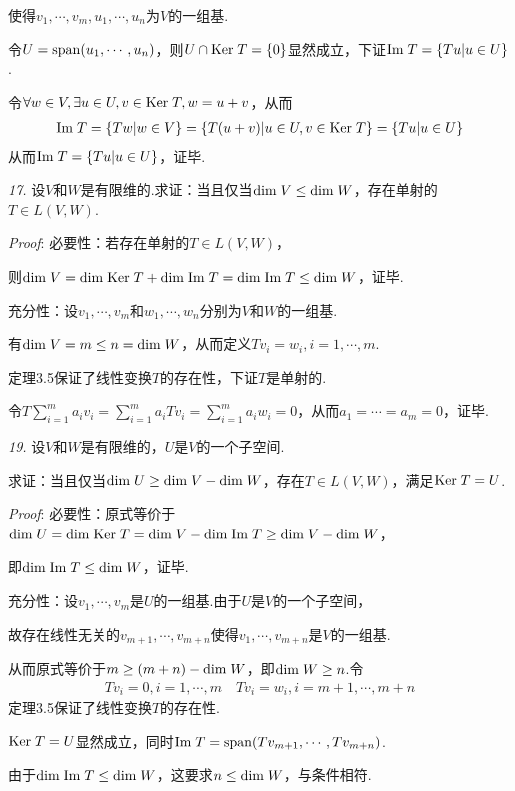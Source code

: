 使得$v_1,\cdots,v_m,u_1,\cdots,u_n$为$V$的一组基.

令$U=\mathrm{span} (u_1,\cdots,u_n)$，则$U\cap \mathrm{Ker \;} T=\{0\}$显然成立，下证$\mathrm{Im \;} T=\{Tu|u\in U\}$.

令$\forall w\in V,\exists u\in U,v\in \mathrm{Ker \;} T, w=u+v$，从而
    \begin{align*}
        \mathrm{Im \;} T=\{Tw|w\in V\}=\{T(u+v)|u\in U,v\in \mathrm{Ker \;} T\}=\{Tu|u\in U\}
    \end{align*}
从而$\mathrm{Im \;} T=\{Tu|u\in U\}$，证毕.

\newpage

\textit{17.}
设$V$和$W$是有限维的.求证：当且仅当$\mathrm{dim \;} V\leq \mathrm{dim \;} W$，存在单射的$T\in L(V,W)$.

\textit{Proof}:
必要性：若存在单射的$T\in L(V,W)$，

则$\mathrm{dim \;} V=\mathrm{dim \;} \mathrm{Ker \;} T+\mathrm{dim \;} \mathrm{Im \;} T=\mathrm{dim \;} \mathrm{Im \;} T \leq \mathrm{dim \;} W$，证毕.

充分性：设$v_1,\cdots,v_m$和$w_1,\cdots,w_n$分别为$V$和$W$的一组基.

有$\mathrm{dim \;} V=m\leq n=\mathrm{dim \;} W$，从而定义$Tv_i=w_i,i=1,\cdots,m$.

定理3.5保证了线性变换$T$的存在性，下证$T$是单射的.

令$T\sum_{i=1}^m a_iv_i=\sum_{i=1}^m a_iTv_i=\sum_{i=1}^m a_iw_i=0$，从而$a_1=\cdots=a_m=0$，证毕.

\hspace*{\fill}

\textit{19.}
设$V$和$W$是有限维的，$U$是$V$的一个子空间.

求证：当且仅当$\mathrm{dim \;} U \geq \mathrm{dim \;} V-\mathrm{dim \;} W$，存在$T\in L(V,W)$，满足$\mathrm{Ker \;} T=U$.

\textit{Proof}:
必要性：原式等价于$\mathrm{dim \;} U=\mathrm{dim \;} \mathrm{Ker \;} T=\mathrm{dim \;} V-\mathrm{dim \;} \mathrm{Im \;} T \geq \mathrm{dim \;} V-\mathrm{dim \;} W$，

即$\mathrm{dim \;} \mathrm{Im \;} T \leq \mathrm{dim \;} W$，证毕.

充分性：设$v_1,\cdots,v_m$是$U$的一组基.由于$U$是$V$的一个子空间，

故存在线性无关的$v_{m+1},\cdots,v_{m+n}$使得$v_1,\cdots,v_{m+n}$是$V$的一组基.

从而原式等价于$m\geq (m+n)-\mathrm{dim \;} W$，即$\mathrm{dim \;} W\geq n$.令
    \begin{align*}
        Tv_i=0,i=1,\cdots,m \quad Tv_i=w_i,i=m+1,\cdots,m+n
    \end{align*}
定理3.5保证了线性变换$T$的存在性.

$\mathrm{Ker \;} T=U$显然成立，同时$\mathrm{Im \;} T=\mathrm{span} (Tv_{m+1},\cdots,Tv_{m+n})$.

由于$\mathrm{dim \;} \mathrm{Im \;} T\leq \mathrm{dim \;} W$，这要求$n\leq \mathrm{dim \;} W$，与条件相符.

